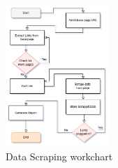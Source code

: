 \begin{figure}[htbp]
    \centering
    \includegraphics[width=0.35\textwidth]{images/workchartscraper.png}
    \caption{Data Scraping workchart}
    \label{fig:scraping-workchart}
\end{figure}

